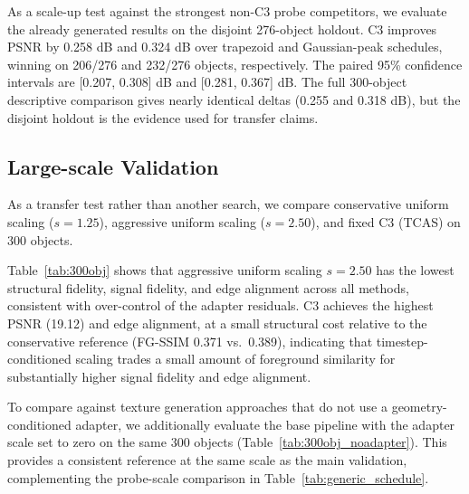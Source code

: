\documentclass[times,twocolumn,final]{elsarticle}
\begin{document}
As a scale-up test against the strongest non-C3 probe competitors, we evaluate the already generated results on the disjoint 276-object holdout. C3 improves PSNR by 0.258 dB and 0.324 dB over trapezoid and Gaussian-peak schedules, winning on 206/276 and 232/276 objects, respectively. The paired 95\% confidence intervals are [0.207, 0.308] dB and [0.281, 0.367] dB. The full 300-object descriptive comparison gives nearly identical deltas (0.255 and 0.318 dB), but the disjoint holdout is the evidence used for transfer claims.

\FloatBarrier

\subsection{Large-scale Validation}
\label{subsec:largescale}

As a transfer test rather than another search, we compare conservative uniform scaling ($s = 1.25$), aggressive uniform scaling ($s = 2.50$), and fixed C3 (TCAS) on 300 objects.

\begin{table}[t]
\centering
\caption{Large-scale validation on 300 objects. Values are absolute metrics of generated outputs with respect to ground truth.}
\label{tab:300obj}
\end{table}


Table~\ref{tab:300obj} shows that aggressive uniform scaling $s = 2.50$ has the lowest structural fidelity, signal fidelity, and edge alignment across all methods, consistent with over-control of the adapter residuals. C3 achieves the highest PSNR (19.12) and edge alignment, at a small structural cost relative to the conservative reference (FG-SSIM 0.371 vs.\ 0.389), indicating that timestep-conditioned scaling trades a small amount of foreground similarity for substantially higher signal fidelity and edge alignment.

To compare against texture generation approaches that do not use a geometry-conditioned adapter, we additionally evaluate the base pipeline with the adapter scale set to zero on the same 300 objects (Table~\ref{tab:300obj_noadapter}). This provides a consistent reference at the same scale as the main validation, complementing the probe-scale comparison in Table~\ref{tab:generic_schedule}.
\end{document}
